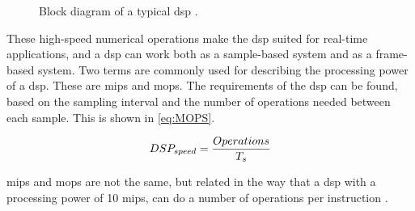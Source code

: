 \begin{figure}
\centering
\def\svgwidth{\columnwidth}

\caption{Block diagram of a typical \gls{dsp} \cite{AnalogDialogue}.}
		\label{fig:typ_dsp}
\end{figure}

These high-speed numerical operations make the \gls{dsp} suited for real-time applications, and a \gls{dsp} can work both as a sample-based system and as a frame-based system. 
Two terms are commonly used for describing the processing power of a \gls{dsp}. These are \gls{mips} and \gls{mops}. The requirements of the \gls{dsp} can be found, based on the sampling interval and the number of operations needed between each sample. This is shown in \eqref{eq:MOPS}.

\begin{equation}\label{eq:MOPS}
        DSP_{speed} = \frac{Operations}{T_s}\addunit{MOPS}
    \end{equation}

    \startexplain
    \stopexplain
    
\gls{mips} and \gls{mops} are not the same, but related in the way that a \gls{dsp} with a processing power of 10 \gls{mips}, can do a number of operations per instruction \cite{AnalogDialogue}.


  
